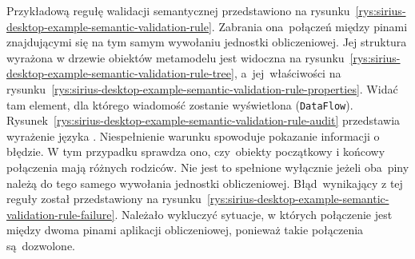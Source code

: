 Przykładową regułę walidacji semantycznej przedstawiono na
rysunku~\ref{rys:sirius-desktop-example-semantic-validation-rule}.
Zabrania ona~połączeń między pinami znajdującymi się na tym samym wywołaniu
jednostki obliczeniowej. Jej struktura wyrażona w drzewie obiektów metamodelu
jest widoczna na
rysunku~\ref{rys:sirius-desktop-example-semantic-validation-rule-tree},
a~jej~właściwości na
rysunku~\ref{rys:sirius-desktop-example-semantic-validation-rule-properties}.
Widać tam element, dla którego wiadomość zostanie wyświetlona
(\texttt{DataFlow}).
Rysunek~\ref{rys:sirius-desktop-example-semantic-validation-rule-audit}
przedstawia wyrażenie języka \AQL{}. Niespełnienie warunku spowoduje
pokazanie
informacji o błędzie. W tym przypadku sprawdza ono, czy~obiekty początkowy i
końcowy połączenia mają różnych rodziców. Nie jest to spełnione wyłącznie
jeżeli oba~piny należą do tego samego wywołania jednostki obliczeniowej.
Błąd~wynikający z tej reguły został
przedstawiony na
rysunku~\ref{rys:sirius-desktop-example-semantic-validation-rule-failure}.
Należało wykluczyć sytuacje, w
których połączenie jest między dwoma pinami aplikacji obliczeniowej, ponieważ
takie połączenia są~dozwolone.

